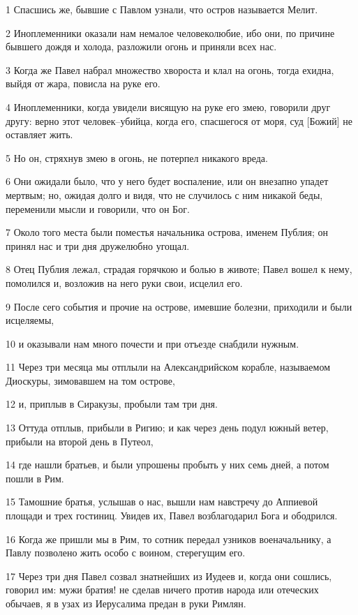 \par 1 Спасшись же, бывшие с Павлом узнали, что остров называется Мелит.
\par 2 Иноплеменники оказали нам немалое человеколюбие, ибо они, по причине бывшего дождя и холода, разложили огонь и приняли всех нас.
\par 3 Когда же Павел набрал множество хвороста и клал на огонь, тогда ехидна, выйдя от жара, повисла на руке его.
\par 4 Иноплеменники, когда увидели висящую на руке его змею, говорили друг другу: верно этот человек--убийца, когда его, спасшегося от моря, суд [Божий] не оставляет жить.
\par 5 Но он, стряхнув змею в огонь, не потерпел никакого вреда.
\par 6 Они ожидали было, что у него будет воспаление, или он внезапно упадет мертвым; но, ожидая долго и видя, что не случилось с ним никакой беды, переменили мысли и говорили, что он Бог.
\par 7 Около того места были поместья начальника острова, именем Публия; он принял нас и три дня дружелюбно угощал.
\par 8 Отец Публия лежал, страдая горячкою и болью в животе; Павел вошел к нему, помолился и, возложив на него руки свои, исцелил его.
\par 9 После сего события и прочие на острове, имевшие болезни, приходили и были исцеляемы,
\par 10 и оказывали нам много почести и при отъезде снабдили нужным.
\par 11 Через три месяца мы отплыли на Александрийском корабле, называемом Диоскуры, зимовавшем на том острове,
\par 12 и, приплыв в Сиракузы, пробыли там три дня.
\par 13 Оттуда отплыв, прибыли в Ригию; и как через день подул южный ветер, прибыли на второй день в Путеол,
\par 14 где нашли братьев, и были упрошены пробыть у них семь дней, а потом пошли в Рим.
\par 15 Тамошние братья, услышав о нас, вышли нам навстречу до Аппиевой площади и трех гостиниц. Увидев их, Павел возблагодарил Бога и ободрился.
\par 16 Когда же пришли мы в Рим, то сотник передал узников военачальнику, а Павлу позволено жить особо с воином, стерегущим его.
\par 17 Через три дня Павел созвал знатнейших из Иудеев и, когда они сошлись, говорил им: мужи братия! не сделав ничего против народа или отеческих обычаев, я в узах из Иерусалима предан в руки Римлян.
